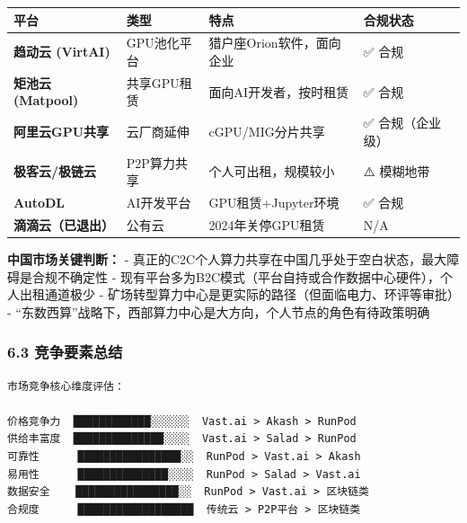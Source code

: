\documentclass[UTF8,a4paper,12pt]{ctexart}
\begin{document}
{\def\LTcaptype{none} %
\begin{longtable}[]{@{}
  >{\raggedright\arraybackslash}p{}
  >{\raggedright\arraybackslash}p{}
  >{\raggedright\arraybackslash}p{}
  >{\raggedright\arraybackslash}p{}@{}}
\toprule\noalign{}
\begin{minipage}[b]{\linewidth}\raggedright
平台
\end{minipage} & \begin{minipage}[b]{\linewidth}\raggedright
类型
\end{minipage} & \begin{minipage}[b]{\linewidth}\raggedright
特点
\end{minipage} & \begin{minipage}[b]{\linewidth}\raggedright
合规状态
\end{minipage} \\
\midrule\noalign{}
\endhead
\bottomrule\noalign{}
\endlastfoot
\textbf{趋动云 (VirtAI)} & GPU池化平台 & 猎户座Orion软件，面向企业 & ✅
合规 \\
\textbf{矩池云 (Matpool)} & 共享GPU租赁 & 面向AI开发者，按时租赁 & ✅
合规 \\
\textbf{阿里云GPU共享} & 云厂商延伸 & cGPU/MIG分片共享 & ✅
合规（企业级） \\
\textbf{极客云/极链云} & P2P算力共享 & 个人可出租，规模较小 & ⚠️
模糊地带 \\
\textbf{AutoDL} & AI开发平台 & GPU租赁+Jupyter环境 & ✅ 合规 \\
\textbf{滴滴云（已退出）} & 公有云 & 2024年关停GPU租赁 & N/A \\
\end{longtable}
}

\textbf{中国市场关键判断：} -
真正的C2C个人算力共享在中国几乎处于空白状态，最大障碍是合规不确定性 -
现有平台多为B2C模式（平台自持或合作数据中心硬件），个人出租通道极少 -
矿场转型算力中心是更实际的路径（但面临电力、环评等审批） -
``东数西算''战略下，西部算力中心是大方向，个人节点的角色有待政策明确

\subsubsection{6.3
竞争要素总结}\label{ux7adeux4e89ux8981ux7d20ux603bux7ed3}

\begin{verbatim}
市场竞争核心维度评估：

价格竞争力  ████████████░░░░░░  Vast.ai > Akash > RunPod
供给丰富度  ██████████████░░░░  Vast.ai > Salad > RunPod
可靠性      ████████████████░░  RunPod > Vast.ai > Akash
易用性      ██████████████░░░░  RunPod > Salad > Vast.ai
数据安全    ████████████████░░  RunPod > Vast.ai > 区块链类
合规度      ██████████████████  传统云 > P2P平台 > 区块链类
\end{verbatim}
\end{document}
